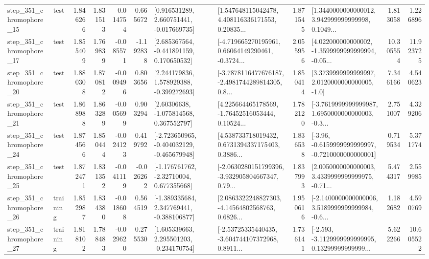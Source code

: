 \begin{tabular}{llrrrrllrlrr}
  step\_351\_chromophore\_15 &      test &      1.846266 &    1.831513 &     -0.014754 &  0.665672 &    [0.916531289, 2.660751441, -0.017669735] &  [1.547648115042478, 4.408116336171553, 0.20835... &       1.871545 &  [1.3440000000000012, 3.942999999999998, 0.1049... &            1.813058 &          1.226896 \\
  step\_351\_chromophore\_17 &      test &      1.855409 &    1.769839 &     -0.085571 & -1.192838 &    [2.685367564, -0.441891159, 0.170650532] &  [-4.719665270195961, 0.66064149290461, -0.3724... &       2.055956 &  [4.022000000000002, -1.3599999999999994, -0.05... &           10.305554 &         11.923725 \\
  step\_351\_chromophore\_20 &      test &      1.880308 &    1.870812 &     -0.009496 &  0.803656 &    [2.244179836, 1.578929388, -0.399272693] &  [-3.7878116477676187, -2.4981744289814305, 0.8... &       1.850414 &     [3.3739999999999997, 2.0120000000000005, -1.0] &            7.346166 &          4.540623 \\
  step\_351\_chromophore\_21 &      test &      1.868988 &    1.863289 &     -0.005699 &  0.903294 &     [2.60306638, -1.075814568, 0.367552797] &  [4.225664465178569, -1.76452516053444, 0.10524... &       1.782120 &  [-3.7619999999999987, 1.6950000000000003, -0.3... &            2.751007 &          4.329206 \\
  step\_351\_chromophore\_24 &      test &      1.874566 &    1.850444 &     -0.024123 &  0.419792 &  [-2.723650965, -0.404032129, -0.465679948] &  [4.538733718019432, 0.6731394337175403, 0.3886... &       1.836538 &  [-3.96, -0.6159999999999997, -0.7210000000000001] &            0.719534 &          5.371774 \\
  step\_351\_chromophore\_25 &      test &      1.872471 &    1.831352 &     -0.041119 & -0.026262 &    [-1.176761762, -2.32710004, 0.677355668] &  [-2.0630280151799396, -3.932905804667347, 0.79... &       1.837993 &  [2.0050000000000003, 3.4339999999999975, -0.71... &            5.474317 &          2.559985 \\
  step\_351\_chromophore\_26 &  training &      1.852987 &    1.834380 &     -0.018608 &  0.564519 &   [-1.389335684, 2.347769441, -0.388106877] &  [2.0863322248827303, -4.14564802568763, 0.6826... &       1.950616 &  [-2.1400000000000006, 3.5189999999999984, -0.6... &            1.182682 &          4.590769 \\
  step\_351\_chromophore\_27 &  training &      1.818102 &    1.788483 &     -0.029620 &  0.275530 &    [1.605339663, 2.295501203, -0.234170754] &  [-2.53725335440435, -3.604744107372968, 0.8911... &       1.736141 &  [-2.593, -3.1129999999999995, 0.13299999999999... &            5.622266 &         10.605522 \\

\end{tabular}
